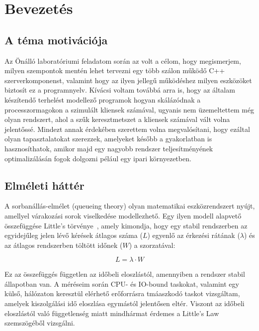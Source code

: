 \documentclass[11pt,a4paper]{article}
\begin{document}
\section{Bevezetés}
\label{sec:bevezetes}
 



\subsection{A téma motivációja}
\label{ssec:motivacio}

Az Önálló laboratóriumi feladatom során az volt a célom, hogy megismerjem,
milyen szempontok mentén lehet tervezni egy több szálon működő C++ szerverkomponenst,
valamint hogy az ilyen jellegű működéshez milyen eszközöket biztosít ez a programnyelv.
Kívácsi voltam továbbá arra is, hogy az általam készítendő terhelést modellező programok
hogyan skálázódnak a processzormagokon a szimulált kliensek számával, ugyanis nem üzemeltettem
még olyan rendszert, ahol a szűk keresztmetszet a kliensek számával vált volna jelentőssé.
Mindezt annak érdekében szerettem volna megvalósítani, hogy ezáltal olyan tapasztalatokat szerezzek, amelyeket
később a gyakorlatban is hasznosíthatok, amikor majd egy nagyobb rendszer teljesítményének optimalizálásán fogok dolgozni
pélául egy ipari környezetben.


\subsection{Elméleti háttér}
\label{ssec:elmeleti-hatter}



A sorbanállás-elmélet (queueing theory) olyan matematikai eszközrendszert nyújt, amellyel
várakozási sorok viselkedése modellezhető. Egy ilyen modell alapvető összefüggése Little's törvénye~\cite{little1961},
amely kimondja, hogy egy stabil rendszerben az egyidejűleg jelen lévő kérések átlagos száma ($L$)
egyenlő az érkezési rátának ($\lambda$) és az átlagos rendszerben töltött időnek ($W$) a szorzatával:

\begin{equation}
    L = \lambda \cdot W
    \label{eq:littles-law}
\end{equation}

Ez az összefüggés független az időbeli eloszlástól, amennyiben a rendszer stabil állapotban van.
A méréseim során CPU- és IO-bound taskokat, valamint egy külső, hálózaton keresztül
elérhető erőforrásra tmáaszkodó taskot vizsgáltam, amelyek kiszolgálási idő eloszlása egymástól jelentősen eltér.
Viszont az időbeli eloszlástól való függetlenség miatt mindhármat érdemes a Little's Law szemszögéből vizsgálni.
\end{document}
